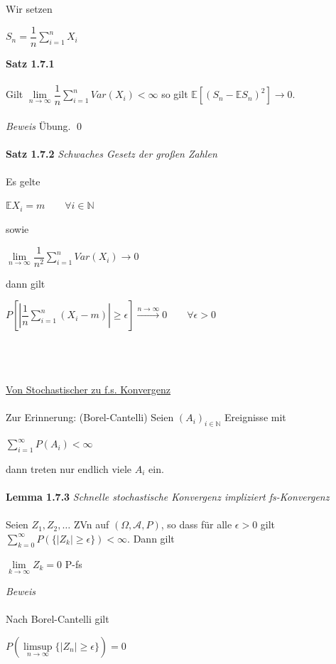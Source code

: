 \documentclass[10pt,a4paper]{report}
\numberwithin{equation}{section}
\numberwithin{figure}{section}
\theoremstyle{plain}
\theoremstyle{definition}
\theoremstyle{plain}
\theoremstyle{definition}
\theoremstyle{remark}
\theoremstyle{plain}
\begin{document}
Wir setzen
\begin{center}
$S_n=\dfrac{1}{n}\sum\limits_{i=1}^nX_i$
\end{center}
\textbf{Satz 1.7.1}\\\\
Gilt $\lim\limits_{n \to \infty} \dfrac{1}{n}\sum\limits_{i=1}^nVar(X_i)<\infty$ so gilt $\mathbb{E}[(S_n-\mathbb{E}S_n)^2]\to 0$.\\\\
\textit{Beweis} Übung. \qed\\\\
\textbf{Satz 1.7.2} \textit{Schwaches Gesetz der großen Zahlen}\\\\
Es gelte 
\begin{center}
$\mathbb{E}X_i=m\qquad \forall i \in \mathbb{N}$
\end{center}
sowie
\begin{center}
$\lim\limits_{n \to \infty} \dfrac{1}{n^2}\sum\limits_{i=1}^nVar(X_i) \to 0$
\end{center}
dann gilt
\begin{center}
$P\left[\left|\dfrac{1}{n}\sum\limits_{i=1}^n(X_i-m)\right|\geq \epsilon\right] \overset{n \to \infty}{\to} 0 \qquad \forall \epsilon >0$
\end{center}
$ $\\\\\\
\underline{Von Stochastischer zu f.s. Konvergenz}\\\\
Zur Erinnerung: (Borel-Cantelli) Seien $(A_i)_{i \in \mathbb{N}}$ Ereignisse mit
\begin{center}
$\sum\limits_{i=1}^\infty P(A_i) < \infty $
\end{center} 
dann treten nur endlich viele $A_i$ ein.\\\\
\textbf{Lemma 1.7.3} \textit{Schnelle stochastische Konvergenz impliziert fs-Konvergenz}\\\\
Seien  $Z_1, Z_2,\ldots$  ZVn auf $(\Omega,\mathcal{A},P)$, so dass für alle $\epsilon >0$ gilt $\sum\limits_{k=0}^\infty P(\{|Z_k|\geq \epsilon\})< \infty $. Dann gilt
\begin{center}
$\lim\limits_{k \to \infty} Z_k=0$ P-fs
\end{center}
\textit{Beweis}\\\\
Nach Borel-Cantelli gilt
\begin{center}
$P\left(\limsup\limits_{n \to \infty}\{|Z_n|\geq \epsilon\}\right)=0$
\end{center}
\end{document}
